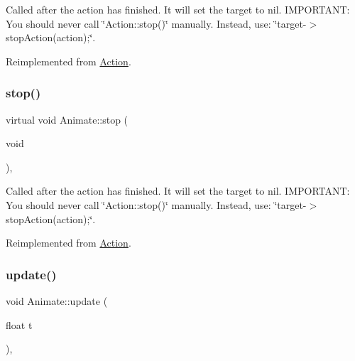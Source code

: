 Called after the action has finished. It will set the \textquotesingle{}target\textquotesingle{} to nil. I\+M\+P\+O\+R\+T\+A\+NT\+: You should never call \char`\"{}\+Action\+::stop()\char`\"{} manually. Instead, use\+: \char`\"{}target-\/$>$stop\+Action(action);\char`\"{}. 

Reimplemented from \hyperlink{classAction_a968267fa7a1dcc46a2976249a712d3c8}{Action}.

\mbox{\label{classAnimate_acca8e3d000ced3182958b87e531ac423}} 
\subsubsection{\texorpdfstring{stop()}{stop()}\hspace{0.1cm}{\footnotesize\ttfamily [2/2]}}
{\footnotesize\ttfamily virtual void Animate\+::stop (\begin{DoxyParamCaption}\item[{void}]{ }\end{DoxyParamCaption})\hspace{0.3cm}{\ttfamily [override]}, {\ttfamily [virtual]}}

Called after the action has finished. It will set the \textquotesingle{}target\textquotesingle{} to nil. I\+M\+P\+O\+R\+T\+A\+NT\+: You should never call \char`\"{}\+Action\+::stop()\char`\"{} manually. Instead, use\+: \char`\"{}target-\/$>$stop\+Action(action);\char`\"{}. 

Reimplemented from \hyperlink{classAction_a968267fa7a1dcc46a2976249a712d3c8}{Action}.

\mbox{\label{classAnimate_ae86fbd3249e9272b1d35d7256d6bcfd6}} 
\subsubsection{\texorpdfstring{update()}{update()}\hspace{0.1cm}{\footnotesize\ttfamily [1/2]}}
{\footnotesize\ttfamily void Animate\+::update (\begin{DoxyParamCaption}\item[{float}]{t }\end{DoxyParamCaption})\hspace{0.3cm}{\ttfamily [override]}, {\ttfamily [virtual]}}



